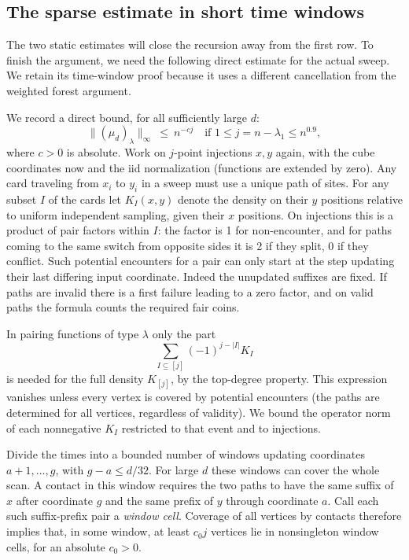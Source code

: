 \subsection{The sparse estimate in short time windows}
\label{ten:frames:part:177}
The two static estimates will close the recursion away from the first row. To finish the argument, we need the following direct estimate for the actual sweep. We retain its time-window proof because it uses a different cancellation from the weighted forest argument.

We record a direct bound, for all sufficiently large \(d\):
\begin{equation}
 \|(\mu_d)_\lambda\|_\infty\ \le\ n^{-c j}
 \quad\text{if }1\le j=n-\lambda_1\le n^{0.9},
 \label{ten:frames:eq:16}
\end{equation}
where \(c>0\) is absolute. Work on \(j\)-point injections \(x,y\) again, with the cube coordinates now and the iid normalization (functions are extended by zero). Any card traveling from \(x_i\) to \(y_i\) in a sweep must use a unique path of sites. For any subset \(I\) of the cards let \(K_I(x,y)\) denote the density on their \(y\) positions relative to uniform independent sampling, given their \(x\) positions. On injections this is a product of pair factors within \(I\): the factor is 1 for non-encounter, and for paths coming to the same switch from opposite sides it is 2 if they split, 0 if they conflict. Such potential encounters for a pair can only start at the step updating their last differing input coordinate. Indeed the unupdated suffixes are fixed. If paths are invalid there is a first failure leading to a zero factor, and on valid paths the formula counts the required fair coins.

In pairing functions of type \(\lambda\) only the part
\[
 \sum_{I\subseteq[j]} (-1)^{j-|I|} K_I
\]
is needed for the full density \(K_{[j]}\), by the top-degree property. This expression vanishes unless every vertex is covered by potential encounters (the paths are determined for all vertices, regardless of validity). We bound the operator norm of each nonnegative \(K_I\) restricted to that event and to injections.

Divide the times into a bounded number of windows updating coordinates $a+1,\ldots,g$, with $g-a\le d/32$. For large $d$ these windows can cover the whole scan. A contact in this window requires the two paths to have the same suffix of $x$ after coordinate $g$ and the same prefix of $y$ through coordinate $a$. Call each such suffix-prefix pair a \emph{window cell}. Coverage of all vertices by contacts therefore implies that, in some window, at least $c_0j$ vertices lie in nonsingleton window cells, for an absolute $c_0>0$.

